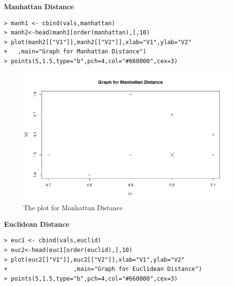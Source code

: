 \documentclass[fontsize=10pt]{scrartcl}
\begin{document}
\begin{enumerate}
\begin{enumerate}
			\newpage
			\textbf{\large Manhattan Distance} \\

\begin{verbatim}
> manh1 <- cbind(vals,manhattan)
> manh2<-head(manh1[order(manhattan),],10)
> plot(manh2[["V1"]],manh2[["V2"]],xlab="V1",ylab="V2"
+	,main="Graph for Manhattan Distance")
> points(5,1.5,type="b",pch=4,col="#660000",cex=3)

\end{verbatim}
			\begin{figure}[H]
				\begin{center}
					\includegraphics[scale=.5]{resources/manhattan.png}
					\caption{The plot for Manhattan Distance}
				\end{center}
			\end{figure}


			\newpage
			\textbf{\large Euclidean Distance} \\

\begin{verbatim}
> euc1 <- cbind(vals,euclid)
> euc2<-head(euc1[order(euclid),],10)
> plot(euc2[["V1"]],euc2[["V2"]],xlab="V1",ylab="V2"
+					,main="Graph for Euclidean Distance")
> points(5,1.5,type="b",pch=4,col="#660000",cex=3)


\end{verbatim}
\end{enumerate}
\end{enumerate}
\end{document}
